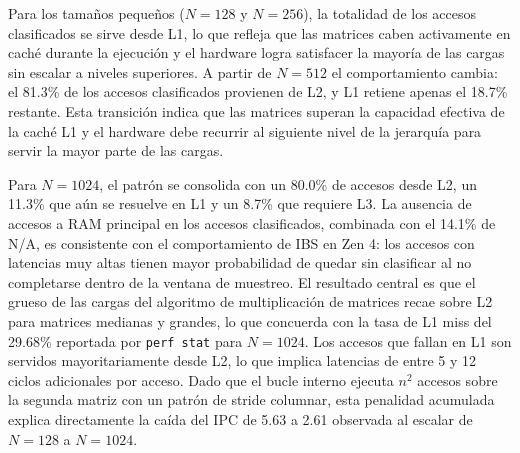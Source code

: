 Para los tamaños pequeños ($N=128$ y $N=256$), la totalidad de los accesos clasificados se sirve desde L1, lo que refleja que las matrices caben activamente en caché durante la ejecución y el hardware logra satisfacer la mayoría de las cargas sin escalar a niveles superiores. A partir de $N=512$ el comportamiento cambia: el 81.3\% de los accesos clasificados provienen de L2, y L1 retiene apenas el 18.7\% restante. Esta transición indica que las matrices superan la capacidad efectiva de la caché L1 y el hardware debe recurrir al siguiente nivel de la jerarquía para servir la mayor parte de las cargas.

Para $N=1024$, el patrón se consolida con un 80.0\% de accesos desde L2, un 11.3\% que aún se resuelve en L1 y un 8.7\% que requiere L3. La ausencia de accesos a RAM principal en los accesos clasificados, combinada con el 14.1\% de N/A, es consistente con el comportamiento de IBS en Zen 4: los accesos con latencias muy altas tienen mayor probabilidad de quedar sin clasificar al no completarse dentro de la ventana de muestreo. El resultado central es que el grueso de las cargas del algoritmo de multiplicación de matrices recae sobre L2 para matrices medianas y grandes, lo que concuerda con la tasa de L1 miss del 29.68\% reportada por \texttt{perf stat} para $N=1024$. Los accesos que fallan en L1 son servidos mayoritariamente desde L2, lo que implica latencias de entre 5 y 12 ciclos adicionales por acceso. Dado que el bucle interno ejecuta $n^2$ accesos sobre la segunda matriz con un patrón de stride columnar, esta penalidad acumulada explica directamente la caída del IPC de 5.63 a 2.61 observada al escalar de $N=128$ a $N=1024$.